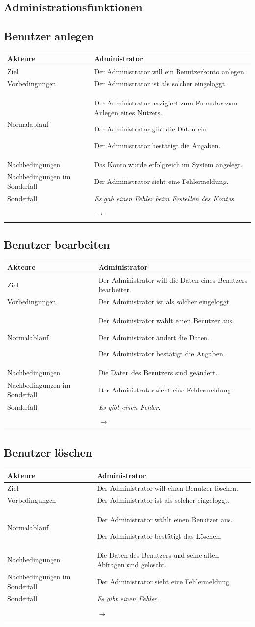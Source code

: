 \documentclass[a4paper,10pt,titlepage]{article}
\makeatletter
\newcommand\novspace{\@minipagetrue}
\newenvironment{owncompactitem}{%
\compactitem
}{%
\@finalstrut\@arstrutbox
\@nameuse{endcompactitem}%
\aftergroup\let\aftergroup\@finalstrut\aftergroup\@gobble
}
\newenvironment{owncompactenum}{%
\compactenum
}{%
\@finalstrut\@arstrutbox
\@nameuse{endcompactenum}%
\aftergroup\let\aftergroup\@finalstrut\aftergroup\@gobble
}
\newcommand{\usecase}[7]
{\subsection{#1}
\setlength{\extrarowheight}{2pt}
\begin{tabular}{|p{0.2\textwidth}|p{0.9\textwidth}|}
\hline
  Akteure & #2\\\hline
  Ziel & #3\\\hline
  Vorbedingungen & \novspace
  	\begin{owncompactitem}[-] #4 \end{owncompactitem} \\\hline
  Normalablauf & \vspace{-7pt}
  	\begin{owncompactenum}[1.] #6 \end{owncompactenum} \\\hline
  Nachbedingungen & \novspace
  	\begin{owncompactitem}[-] #5 \end{owncompactitem} \\\hline
  #7
\end{tabular}
}
\newcommand{\kurzersonderfall}[3][\empty]
{
Sonderfall #2 & \vspace{-10pt}
	\textit{#3}
  	\ifthenelse{\equal{#1}{\empty}}
    	{\\\hline} %
    	{\\&\ensuremath{\rightarrow} #1 \\ [+1pt] \hline} %

}
\newcommand{\sondernachbedingung}[1]
{
Nachbedingungen im Sonderfall& \novspace
	\begin{owncompactitem}[-]
		#1
	\end{owncompactitem} \\\hline
}
\makeatother
\begin{document}
\subsection*{Administrationsfunktionen}
\usecase{Benutzer anlegen}{Administrator}%
{%
Der Administrator will ein Benutzerkonto anlegen.
}{%
	\item Der Administrator ist als solcher eingeloggt.
}{%
	\item Das Konto wurde erfolgreich im System angelegt.
}{%
	\item Der Administrator navigiert zum Formular zum Anlegen eines Nutzers.
	\item Der Administrator gibt die Daten ein.
	\item Der Administrator bestätigt die Angaben.
}{%
\sondernachbedingung{
	\item Der Administrator sieht eine Fehlermeldung.
	}
\kurzersonderfall[]{}%
	{%
	Es gab einen Fehler beim Erstellen des Kontos.
	}
}

\usecase{Benutzer bearbeiten}{Administrator}%
{%
Der Administrator will die Daten eines Benutzers bearbeiten.
}{%
	\item Der Administrator ist als solcher eingeloggt.
}{%
	\item Die Daten des Benutzers sind geändert.
}{%
	\item Der Administrator wählt einen Benutzer aus.
	\item Der Administrator ändert die Daten.
	\item Der Administrator bestätigt die Angaben.
}{%
\sondernachbedingung{
	\item Der Administrator sieht eine Fehlermeldung.
	}
\kurzersonderfall[]{}%
	{%
	Es gibt einen Fehler.
	}
}

\usecase{Benutzer löschen}{Administrator}%
{%
Der Administrator will einen Benutzer löschen.
}{%
	\item Der Administrator ist als solcher eingeloggt.
}{%
	\item Die Daten des Benutzers und seine alten Abfragen sind gelöscht.
}{%
	\item Der Administrator wählt einen Benutzer aus.
	\item Der Administrator bestätigt das Löschen.
}{%
\sondernachbedingung{
	\item Der Administrator sieht eine Fehlermeldung.
	}
\kurzersonderfall[]{}%
	{%
	Es gibt einen Fehler.
	}
}
\end{document}
